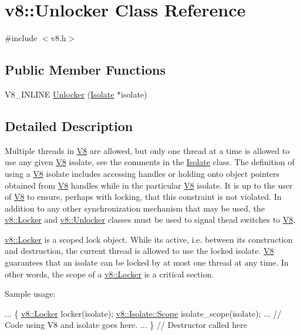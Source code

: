 \hypertarget{classv8_1_1Unlocker}{}\section{v8\+:\+:Unlocker Class Reference}
\label{classv8_1_1Unlocker}


{\ttfamily \#include $<$v8.\+h$>$}

\subsection*{Public Member Functions}
\begin{DoxyCompactItemize}
\item 
V8\+\_\+\+I\+N\+L\+I\+N\+E \hyperlink{classv8_1_1Unlocker_a2faeb117d7308b65ac85fdad390e4c1f}{Unlocker} (\hyperlink{classv8_1_1Isolate}{Isolate} $\ast$isolate)
\end{DoxyCompactItemize}


\subsection{Detailed Description}
Multiple threads in \hyperlink{classv8_1_1V8}{V8} are allowed, but only one thread at a time is allowed to use any given \hyperlink{classv8_1_1V8}{V8} isolate, see the comments in the \hyperlink{classv8_1_1Isolate}{Isolate} class. The definition of \textquotesingle{}using a \hyperlink{classv8_1_1V8}{V8} isolate\textquotesingle{} includes accessing handles or holding onto object pointers obtained from \hyperlink{classv8_1_1V8}{V8} handles while in the particular \hyperlink{classv8_1_1V8}{V8} isolate. It is up to the user of \hyperlink{classv8_1_1V8}{V8} to ensure, perhaps with locking, that this constraint is not violated. In addition to any other synchronization mechanism that may be used, the \hyperlink{classv8_1_1Locker}{v8\+::\+Locker} and \hyperlink{classv8_1_1Unlocker}{v8\+::\+Unlocker} classes must be used to signal thead switches to \hyperlink{classv8_1_1V8}{V8}.

\hyperlink{classv8_1_1Locker}{v8\+::\+Locker} is a scoped lock object. While it\textquotesingle{}s active, i.\+e. between its construction and destruction, the current thread is allowed to use the locked isolate. \hyperlink{classv8_1_1V8}{V8} guarantees that an isolate can be locked by at most one thread at any time. In other words, the scope of a \hyperlink{classv8_1_1Locker}{v8\+::\+Locker} is a critical section.

Sample usage\+: 
\begin{DoxyCode}
...
\{
  \hyperlink{classv8_1_1Locker}{v8::Locker} locker(isolate);
  \hyperlink{classv8_1_1Isolate_1_1Scope}{v8::Isolate::Scope} isolate\_scope(isolate);
  ...
  \textcolor{comment}{// Code using V8 and isolate goes here.}
  ...
\} \textcolor{comment}{// Destructor called here}
\end{DoxyCode}


